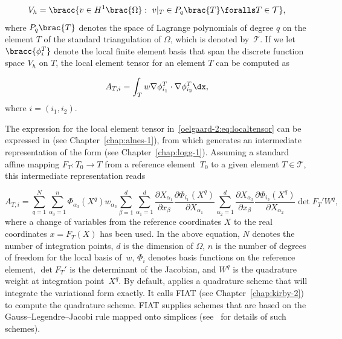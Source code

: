 \begin{equation}
  V_{h} = \bracc{v \in H^{1}\brac{\Omega}: \ v\vert_T \in P_{q}\brac{T}
    \foralls T \in \mathcal{T}},
  \label{oelgaard-2:eq:space_H1}
\end{equation}
%
where $P_{q}\brac{T}$ denotes the space of Lagrange polynomials of
degree $q$ on the element $T$ of the standard triangulation of
$\Omega$, which is denoted by~$\mathcal{T}$.  If we let
$\bracc{\phi^{T}_{i}}$ denote the local finite element basis that span
the discrete function space $V_{h}$ on $T$, the local element tensor
for an element $T$ can be computed as

\begin{equation}
  A_{T,i} = \int_{T} w \nabla \phi^{T}_{i_1} \cdot \nabla
  \phi^{T}_{i_2} \dx,
  \label{oelgaard-2:eq:localtensor}
\end{equation}
%
where $i = (i_{1}, i_{2})$.

The expression for the local element tensor
in~\eqref{oelgaard-2:eq:localtensor} can be expressed in \ufl{} (see
Chapter~\ref{chap:alnes-1}), from which \ffc{} generates an
intermediate representation of the form (see
Chapter~\ref{chap:logg-1}).  Assuming a standard affine mapping $F_T :
T_0 \rightarrow T$ from a reference element~$T_{0}$ to a given element
$T \in \mathcal{T}$, this intermediate representation reads

\begin{equation}
  A_{T,i}
  =
  \sum_{q=1}^{N}
  \sum_{\alpha_{3}=1}^n
  \Phi_{\alpha_{3}}(X^q)
  w_{\alpha_{3}}
  \sum_{\beta=1}^d
  \sum_{\alpha_1=1}^d
  \frac{\partial X_{\alpha_1}}{\partial x_{\beta}}
  \frac{\partial \Phi_{i_1}(X^q)}{\partial X_{\alpha_1}}
  \sum_{\alpha_2=1}^d
  \frac{\partial X_{\alpha_2}}{\partial x_{\beta}}
  \frac{\partial \Phi_{i_2}(X^q)}{\partial X_{\alpha_2}}
  \det F_T'
  W^q,
\label{oelgaard-2:eq:weightedlaplacian_quadraturerepresentation}
\end{equation}
%
where a change of variables from the reference coordinates $X$ to the
real coordinates $x = F_T(X)$ has been used. In the above equation,
$N$ denotes the number of integration points, $d$ is the dimension of
$\Omega$, $n$ is the number of degrees of freedom for the local basis
of~$w$, $\Phi_{i}$ denotes basis functions on the reference element,
$\det F_T'$ is the determinant of the Jacobian, and $W^q$ is the
quadrature weight at integration point~$X^q$.  By default, \ffc{}
applies a quadrature scheme that will integrate the variational form
exactly.  It calls FIAT (see Chapter~\ref{chap:kirby-2}) to compute
the quadrature scheme.  FIAT supplies schemes that are based on the
Gauss--Legendre--Jacobi rule mapped onto simplices
(see~\citet{KarniadakisSherwin2005} for details of such schemes).

